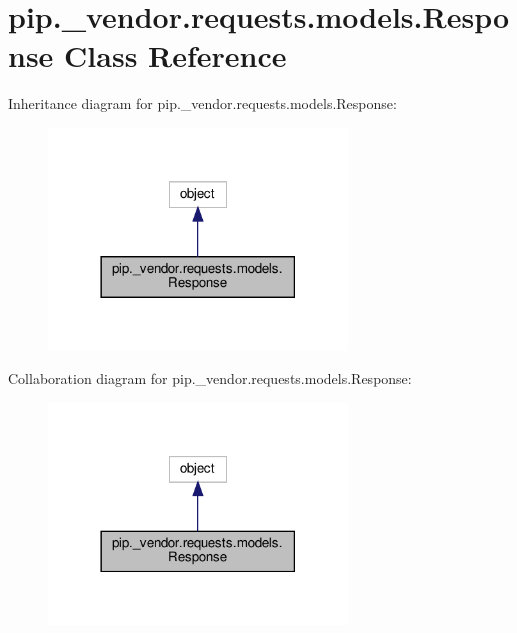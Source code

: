 \hypertarget{classpip_1_1__vendor_1_1requests_1_1models_1_1Response}{}\section{pip.\+\_\+vendor.\+requests.\+models.\+Response Class Reference}
\label{classpip_1_1__vendor_1_1requests_1_1models_1_1Response}


Inheritance diagram for pip.\+\_\+vendor.\+requests.\+models.\+Response\+:
\nopagebreak
\begin{figure}[H]
\begin{center}
\leavevmode
\includegraphics[width=225pt]{classpip_1_1__vendor_1_1requests_1_1models_1_1Response__inherit__graph}
\end{center}
\end{figure}


Collaboration diagram for pip.\+\_\+vendor.\+requests.\+models.\+Response\+:
\nopagebreak
\begin{figure}[H]
\begin{center}
\leavevmode
\includegraphics[width=225pt]{classpip_1_1__vendor_1_1requests_1_1models_1_1Response__coll__graph}
\end{center}
\end{figure}
